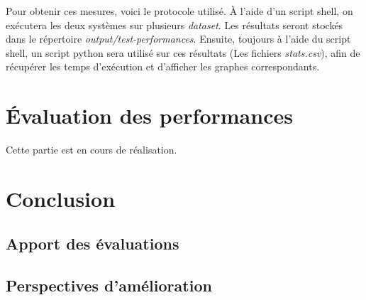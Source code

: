 \documentclass[12pt,titlepage]{article}
\begin{document}
Pour obtenir ces mesures, voici le protocole utilisé. À l'aide d'un script shell, on exécutera les deux systèmes sur plusieurs \textit{dataset}. Les résultats seront stockés dans le répertoire \textit{output/test-performances}. Ensuite, toujours à l'aide du script shell, un script python sera utilisé sur ces résultats (Les fichiers \textit{stats.csv}), afin de récupérer les temps d'exécution et d'afficher les graphes correspondants.

\section{Évaluation des performances}

Cette partie est en cours de réalisation.

\section{Conclusion}

\subsection{Apport des évaluations}

\subsection{Perspectives d'amélioration}
\end{document}
